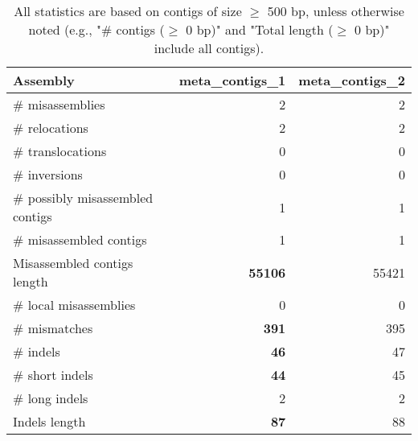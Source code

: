 \documentclass[12pt,a4paper]{article}
\begin{document}
\begin{table}[ht]
\begin{center}
\caption{All statistics are based on contigs of size $\geq$ 500 bp, unless otherwise noted (e.g., "\# contigs ($\geq$ 0 bp)" and "Total length ($\geq$ 0 bp)" include all contigs).}
\begin{tabular}{|l*{2}{|r}|}
\hline
Assembly & meta\_contigs\_1 & meta\_contigs\_2 \\ \hline
\# misassemblies & 2 & 2 \\ \hline
\hspace{5mm}\# relocations & 2 & 2 \\ \hline
\hspace{5mm}\# translocations & 0 & 0 \\ \hline
\hspace{5mm}\# inversions & 0 & 0 \\ \hline
\# possibly misassembled contigs & 1 & 1 \\ \hline
\# misassembled contigs & 1 & 1 \\ \hline
Misassembled contigs length & {\bf 55106} & 55421 \\ \hline
\# local misassemblies & 0 & 0 \\ \hline
\# mismatches & {\bf 391} & 395 \\ \hline
\# indels & {\bf 46} & 47 \\ \hline
\hspace{5mm}\# short indels & {\bf 44} & 45 \\ \hline
\hspace{5mm}\# long indels & 2 & 2 \\ \hline
Indels length & {\bf 87} & 88 \\ \hline
\end{tabular}
\end{center}
\end{table}
\end{document}
